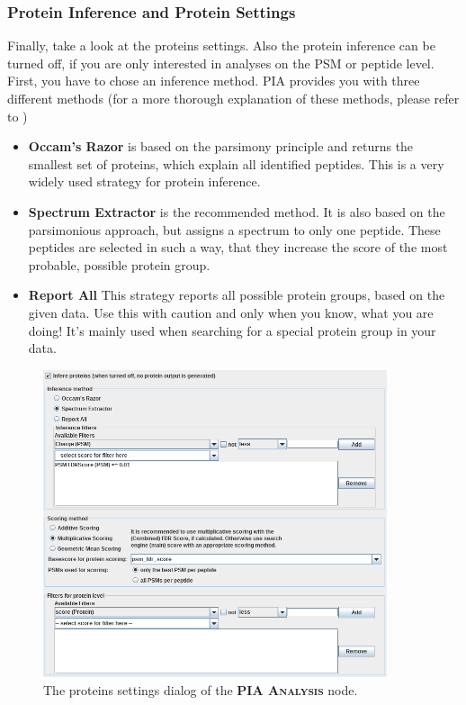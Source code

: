 \documentclass[a4paper,11pt,twoside]{article}
\newcommand{\knimenode}[1]{{\scshape\bfseries #1}}
\begin{document}
\subsubsection{Protein Inference and Protein Settings}

Finally, take a look at the proteins settings. Also the protein inference can
be turned off, if you are only interested in analyses on the PSM or peptide
level. First, you have to chose an inference method. PIA provides you with
three different methods (for a more thorough explanation of these methods,
please refer to \cite{uszkoreit2015})

\begin{itemize}
	\item \textbf{Occam's Razor} is based on the parsimony principle and
	returns the smallest set of proteins, which explain all identified
	peptides. This is a very widely used strategy for protein inference.

	\item \textbf{Spectrum Extractor} is the recommended method. It is also
	based on the parsimonious approach, but assigns a spectrum to only one
	peptide. These peptides are selected in such a way, that they increase the
	score of the most probable, possible protein group.

	\item \textbf{Report All} This strategy reports all possible protein groups,
	based on the given data. Use this with caution and only when you know, what
	you are doing! It's mainly used when searching for a special protein group in
	your data.
\end{itemize}

\begin{figure}[ht!]
	\centering
	\includegraphics[width=0.9\textwidth]{graphics/pia_settings_proteins}
	\caption{The proteins settings dialog of the \knimenode{PIA Analysis} node.}
	\label{pia_settings_proteins}
\end{figure}
\end{document}
